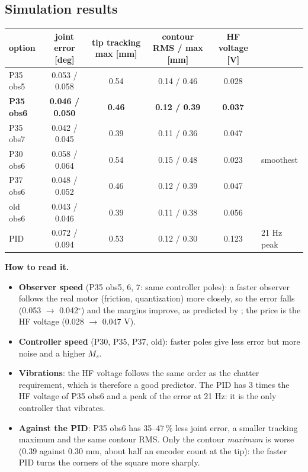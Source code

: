 \documentclass[10pt,a4paper]{article}
\begin{document}
\subsection{Simulation results}
{\small
\begin{tabularx}{\linewidth}{@{}l c c c c X@{}}
\toprule
option & joint error [deg] & tip tracking max [mm] & contour RMS / max [mm] & HF voltage [V] & \\
\midrule
P35 obs5 & 0.053 / 0.058 & 0.54 & 0.14 / 0.46 & 0.028 & \\
\textbf{P35 obs6} & \textbf{0.046 / 0.050} & \textbf{0.46} & \textbf{0.12 / 0.39} & \textbf{0.037} & \\
P35 obs7 & 0.042 / 0.045 & 0.39 & 0.11 / 0.36 & 0.047 & \\
P30 obs6 & 0.058 / 0.064 & 0.54 & 0.15 / 0.48 & 0.023 & smoothest \\
P37 obs6 & 0.048 / 0.052 & 0.46 & 0.12 / 0.39 & 0.047 & \\
old obs6 & 0.043 / 0.046 & 0.39 & 0.11 / 0.38 & 0.056 & \\
\midrule
PID & 0.072 / 0.094 & 0.53 & 0.12 / 0.30 & 0.123 & 21 Hz peak \\
\bottomrule
\end{tabularx}}

\textbf{How to read it.}
\begin{itemize}
  \item \textbf{Observer speed} (P35 obs5, 6, 7: same controller poles): a faster observer follows the real motor
        (friction, quantization) more closely, so the error falls (0.053 $\to$ 0.042$^\circ$) and the margins improve,
        as predicted by \cite{DoyleStein1979}; the price is the HF voltage (0.028 $\to$ 0.047 V).
  \item \textbf{Controller speed} (P30, P35, P37, old): faster poles give less error but more noise and a higher $M_s$.
  \item \textbf{Vibrations}: the HF voltage follows the same order as the chatter requirement, which is therefore a good
        predictor. The PID has 3 times the HF voltage of P35 obs6 and a peak of the error at 21 Hz: it is the only
        controller that vibrates.
  \item \textbf{Against the PID}: P35 obs6 has 35--47\,\% less joint error, a smaller tracking maximum and the same contour
        RMS. Only the contour \emph{maximum} is worse (0.39 against 0.30 mm, about half an encoder count at the tip): the
        faster PID turns the corners of the square more sharply.
\end{itemize}
\end{document}
